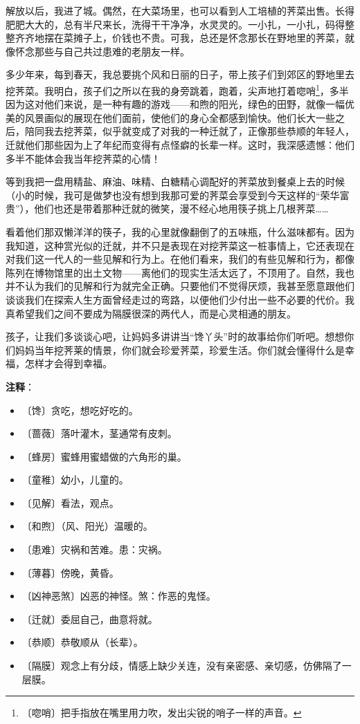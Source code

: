 \documentclass[12pt,UTF-8,openany]{ctexbook}
\begin{document}
\begin{large}
    解放以后，我进了城。偶然，在大菜场里，也可以看到人工培植的荠菜出售。长得肥肥大大的，总有半尺来长，洗得干干净净，水灵灵的。一小扎，一小扎，码得整整齐齐地摆在菜摊子上，价钱也不贵。可我，总还是怀念那长在野地里的荠菜，就像怀念那些与自己共过患难的老朋友一样。
    
    多少年来，每到春天，我总要挑个风和日丽的日子，带上孩子们到郊区的野地里去挖荠菜。我明白，孩子们之所以在我的身旁跳着，跑着，尖声地打着唿哨\footnote{〔唿哨〕把手指放在嘴里用力吹，发出尖锐的哨子一样的声音。}，多半因为这对他们来说，是一种有趣的游戏——和煦的阳光，绿色的田野，就像一幅优美的风景画似的展现在他们面前，使他们的身心全都感到愉快。他们长大一些之后，陪同我去挖荠菜，似乎就变成了对我的一种迁就了，正像那些恭顺的年轻人，迁就他们那些因为上了年纪而变得有点怪癖的长辈一样。这时，我深感遗憾：他们多半不能体会我当年挖荠菜的心情！
    
    等到我把一盘用精盐、麻油、味精、白糖精心调配好的荠菜放到餐桌上去的时候（小的时候，我可是做梦也没有想到我那可爱的荠菜会享受到今天这样的“荣华富贵”），他们也还是带着那种迁就的微笑，漫不经心地用筷子挑上几根荠菜……
    
    看着他们那双懒洋洋的筷子，我的心里就像翻倒了的五味瓶，什么滋味都有。因为我知道，这种赏光似的迁就，并不只是表现在对挖荠菜这一桩事情上，它还表现在对我们这一代人的一些见解和行为上。在他们看来，我们的有些见解和行为，都像陈列在博物馆里的出土文物——离他们的现实生活太远了，不顶用了。自然，我也并不认为我们的见解和行为就完全正确。只要他们不觉得厌烦，我甚至愿意跟他们谈谈我们在探索人生方面曾经走过的弯路，以便他们少付出一些不必要的代价。我真希望我们之间不要成为隔膜很深的两代人，而是心灵相通的朋友。
    
    孩子，让我们多谈谈心吧，让妈妈多讲讲当“馋丫头”时的故事给你们听吧。想想你们妈妈当年挖荠莱的情景，你们就会珍爱荠菜，珍爱生活。你们就会懂得什么是幸福，怎样才会得到幸福。
    
\end{large}


\newpage

\textbf{注释}：

\vspace{-1em}

\begin{itemize}
    \setlength\itemsep{-0.2em}
    \item 〔馋〕贪吃，想吃好吃的。
    \item 〔蔷薇〕落叶灌木，茎通常有皮刺。
    \item 〔蜂房〕蜜蜂用蜜蜡做的六角形的巢。
    \item 〔童稚〕幼小，儿童的。
    \item 〔见解〕看法，观点。
    \item 〔和煦〕（风、阳光）温暖的。
    \item 〔患难〕灾祸和苦难。患：灾祸。
    \item 〔薄暮〕傍晚，黄昏。
    \item 〔凶神恶煞〕凶恶的神怪。煞：作恶的鬼怪。
    \item 〔迁就〕委屈自己，曲意将就。
    \item 〔恭顺〕恭敬顺从（长辈）。
    \item 〔隔膜〕观念上有分歧，情感上缺少关连，没有亲密感、亲切感，仿佛隔了一层膜。
\end{itemize}
\end{document}
